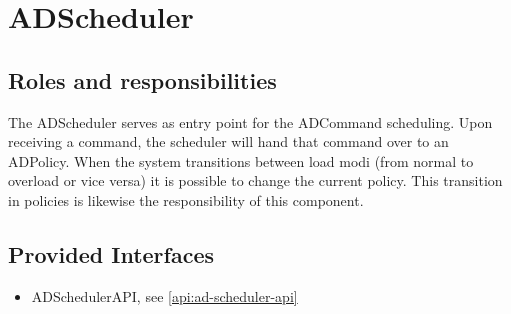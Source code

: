 \section{ADScheduler}
\label{element:ad-scheduler}

\subsection{Roles and responsibilities}

\npar The ADScheduler serves as entry point for the ADCommand scheduling. Upon
receiving a command, the scheduler will hand that command over to an
ADPolicy. When the system transitions between load modi (from normal
to overload or vice versa) it is possible to change the current policy.
This transition in policies is likewise the responsibility of this component.

\subsection{Provided Interfaces}

\begin{itemize}
    \item ADSchedulerAPI, see \ref{api:ad-scheduler-api}
\end{itemize}